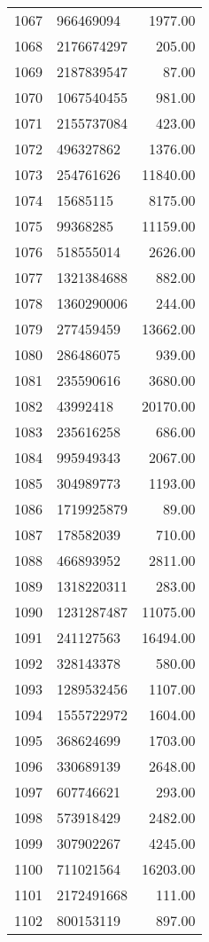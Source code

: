 \begin{table}[ht]
\begin{tabular}{rlr}
  1067 & 966469094 & 1977.00 \\ 
  1068 & 2176674297 & 205.00 \\ 
  1069 & 2187839547 & 87.00 \\ 
  1070 & 1067540455 & 981.00 \\ 
  1071 & 2155737084 & 423.00 \\ 
  1072 & 496327862 & 1376.00 \\ 
  1073 & 254761626 & 11840.00 \\ 
  1074 & 15685115 & 8175.00 \\ 
  1075 & 99368285 & 11159.00 \\ 
  1076 & 518555014 & 2626.00 \\ 
  1077 & 1321384688 & 882.00 \\ 
  1078 & 1360290006 & 244.00 \\ 
  1079 & 277459459 & 13662.00 \\ 
  1080 & 286486075 & 939.00 \\ 
  1081 & 235590616 & 3680.00 \\ 
  1082 & 43992418 & 20170.00 \\ 
  1083 & 235616258 & 686.00 \\ 
  1084 & 995949343 & 2067.00 \\ 
  1085 & 304989773 & 1193.00 \\ 
  1086 & 1719925879 & 89.00 \\ 
  1087 & 178582039 & 710.00 \\ 
  1088 & 466893952 & 2811.00 \\ 
  1089 & 1318220311 & 283.00 \\ 
  1090 & 1231287487 & 11075.00 \\ 
  1091 & 241127563 & 16494.00 \\ 
  1092 & 328143378 & 580.00 \\ 
  1093 & 1289532456 & 1107.00 \\ 
  1094 & 1555722972 & 1604.00 \\ 
  1095 & 368624699 & 1703.00 \\ 
  1096 & 330689139 & 2648.00 \\ 
  1097 & 607746621 & 293.00 \\ 
  1098 & 573918429 & 2482.00 \\ 
  1099 & 307902267 & 4245.00 \\ 
  1100 & 711021564 & 16203.00 \\ 
  1101 & 2172491668 & 111.00 \\ 
  1102 & 800153119 & 897.00 \\ 

\end{tabular}
\end{table}
